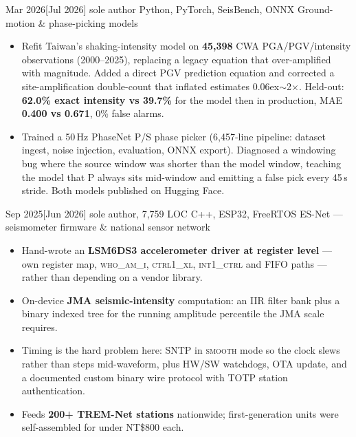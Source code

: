 \documentclass{resume}
\begin{document}
\newpage
\begin{projects}
  \project%
    {Mar 2026}[Jul 2026]%
    {sole author}%
    {Python, PyTorch, SeisBench, ONNX}%
    {Ground-motion \& phase-picking models}%
    {\begin{itemize}
      \item Refit Taiwan's shaking-intensity model on \textbf{45,398} CWA PGA/PGV/intensity observations
        (2000--2025), replacing a legacy equation that over-amplified with magnitude. Added a direct PGV
        prediction equation and corrected a site-amplification double-count that inflated estimates
        {\raise0.06ex\hbox{$\sim$}}2$\times$. Held-out: \textbf{62.0\% exact intensity vs 39.7\%} for the
        model then in production, MAE \textbf{0.400 vs 0.671}, 0\% false alarms.
      \item Trained a 50\,Hz PhaseNet P/S phase picker (6,457-line pipeline: dataset ingest, noise
        injection, evaluation, ONNX export). Diagnosed a windowing bug where the source window was
        shorter than the model window, teaching the model that P always sits mid-window and emitting a
        false pick every 45\,s stride. Both models published on Hugging Face.
    \end{itemize}}

  \project%
    {Sep 2025}[Jun 2026]%
    {sole author, 7,759 LOC}%
    {C++, ESP32, FreeRTOS}%
    {ES-Net --- seismometer firmware \& national sensor network}%
    {\begin{itemize}
      \item Hand-wrote an \textbf{LSM6DS3 accelerometer driver at register level} --- own register
        map, \textsc{who\_am\_i}, \textsc{ctrl1\_xl}, \textsc{int1\_ctrl} and FIFO paths --- rather
        than depending on a vendor library.
      \item On-device \textbf{JMA seismic-intensity} computation: an IIR filter bank plus a binary
        indexed tree for the running amplitude percentile the JMA scale requires.
      \item Timing is the hard problem here: SNTP in \textsc{smooth} mode so the clock slews rather
        than steps mid-waveform, plus HW/SW watchdogs, OTA update, and a documented custom binary wire
        protocol with TOTP station authentication.
      \item Feeds \textbf{200+ TREM-Net stations} nationwide; first-generation units were
        self-assembled for under NT\$800 each.
    \end{itemize}}


\end{projects}
\end{document}
